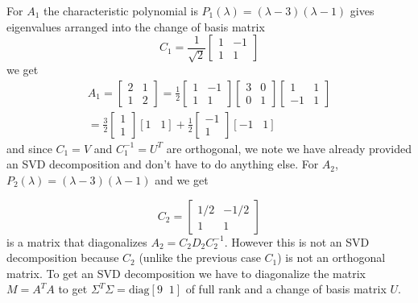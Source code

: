 \documentclass[12pt,a4paper]{article}
\begin{document}
For $A_1$ the characteristic polynomial is $P_1(\lambda)=(\lambda-3)(\lambda-1)$ gives eigenvalues arranged into the change of basis matrix
 \begin{equation}
 C_1=\frac{1}{\sqrt{2}} \left[ \begin{array}{rr}
1 &-1 \\ 
1 & 1
\end{array} \right] 
 \end{equation}
we get
\begin{align*}
A_1=\begin{bmatrix}
2 & 1 \\ 
1 & 2
\end{bmatrix} =\frac{1}{2} \left[ \begin{array}{rr}
1 &-1 \\ 
1 & 1
\end{array} \right] 
 \left[ \begin{array}{rr}
3 & 0 \\ 
0 & 1
\end{array} \right]
 \left[ \begin{array}{rr}
  1 &  1 \\ 
 -1 &  1
\end{array} \right]\\
=\frac{3}{2} \begin{bmatrix}
1 \\ 
1
\end{bmatrix} [1 \;\;\; 1]+\frac{1}{2} \begin{bmatrix}
-1 \\ 
 1
\end{bmatrix} [-1 \;\;\; 1]
\end{align*}
and since $C_1=V$ and $C_1^{-1}=U^T$ are orthogonal, we note we have already provided  an SVD decomposition and don't have to do anything else. For $A_2$, $P_2(\lambda)=(\lambda-3)(\lambda-1)$ and we get 
 
\begin{equation}
 C_2=  \begin{bmatrix}
 1/2 & -1/2 \\ 
 1 & 1
 \end{bmatrix}  
 \end{equation}
is a matrix that diagonalizes $A_2=C_2 D_2 C_{2}^{-1}$. However this is not an SVD decomposition because $C_2$ (unlike the previous case $C_1$) is not an orthogonal matrix. To get an SVD decomposition we have to diagonalize the matrix $M=A^T A$ to get $\Sigma^T \Sigma=\text{diag}[9\;\; 1]$ of full rank and a change of basis matrix $U$. 
\end{document}
